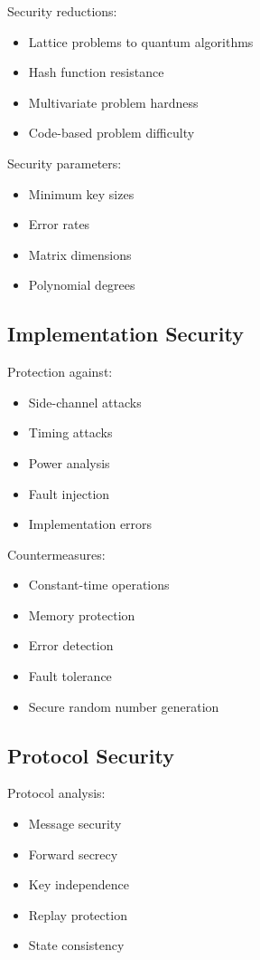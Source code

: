 \documentclass[12pt]{article}
\begin{document}
Security reductions:

\begin{itemize}
\item Lattice problems to quantum algorithms
\item Hash function resistance
\item Multivariate problem hardness
\item Code-based problem difficulty
\end{itemize}

Security parameters:

\begin{itemize}
\item Minimum key sizes
\item Error rates
\item Matrix dimensions
\item Polynomial degrees
\end{itemize}

\subsection{Implementation Security}

Protection against:

\begin{itemize}
\item Side-channel attacks
\item Timing attacks
\item Power analysis
\item Fault injection
\item Implementation errors
\end{itemize}

Countermeasures:

\begin{itemize}
\item Constant-time operations
\item Memory protection
\item Error detection
\item Fault tolerance
\item Secure random number generation
\end{itemize}

\subsection{Protocol Security}

Protocol analysis:

\begin{itemize}
\item Message security
\item Forward secrecy
\item Key independence
\item Replay protection
\item State consistency
\end{itemize}
\end{document}
